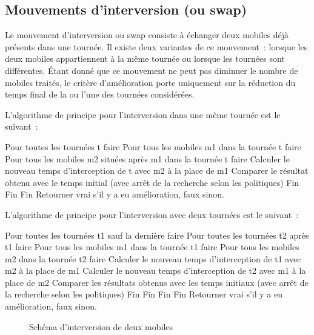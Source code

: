 		\subsection{Mouvements d'interversion (ou swap)}
			Le mouvement d'interversion ou swap consiste à échanger deux mobiles déjà présents dans une tournée. Il existe deux variantes de ce mouvement : lorsque les deux mobiles appartiennent à la même tournée ou lorsque les tournées sont différentes. Étant donné que ce mouvement ne peut pas diminuer le nombre de mobiles traités, le critère d'amélioration porte uniquement sur la réduction du temps final de la ou l'une des tournées considérées.

			L'algorithme de principe pour l'interversion dans une même tournée est le suivant :
			
Pour toutes les tournées t faire
	Pour tous les mobiles m1 dans la tournée t faire
		Pour tous les mobiles m2 situées après m1 dans la tournée t faire
			Calculer le nouveau temps d'interception de t avec m2 à la place de m1
			Comparer le résultat obtenu avec le temps initial (avec arrêt de la 					recherche selon les politiques)
		Fin
	Fin
Fin
Retourner vrai s'il y a eu amélioration, faux sinon.

			L'algorithme de principe pour l'interversion avec deux tournées est le suivant :
			
Pour toutes les tournées t1 sauf la dernière faire
	Pour toutes les tournées t2 après t1 faire
		Pour tous les mobiles m1 dans la tournée t1 faire
			Pour tous les mobiles m2 dans la tournée t2 faire
				Calculer le nouveau temps d'interception de t1 avec m2 à la place de 				m1
				Calculer le nouveau temps d'interception de t2 avec m1 à la place de 				m2
				Comparer les résultats obtenus avec les temps initiaux (avec arrêt de 				la recherche selon les politiques)
			Fin
		Fin
	Fin
Fin
Retourner vrai s'il y a eu amélioration, faux sinon.
			
			\begin{figure}[h!]
			\begin{subfigure}[b]{.54\linewidth}
				\centering
				\begin{tikzpicture}[schema]
					
				\end{tikzpicture}
				\label{subfig:move_swap1route}
			\end{subfigure}
			\hfill
			\begin{subfigure}[b]{.45\linewidth}
				\centering
				\begin{tikzpicture}[schema]
					
				\end{tikzpicture}
				\label{subfig:move_swap2routes}
			\end{subfigure}
			\caption{Schéma d'interversion de deux mobiles}
			\label{fig:move_swap}
			\end{figure}

